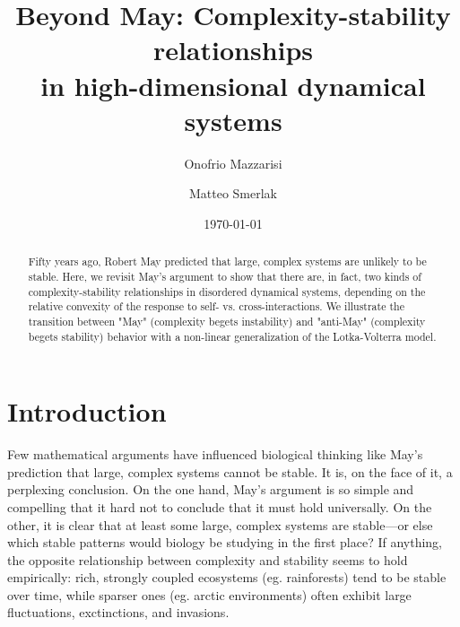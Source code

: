 \documentclass[%
 reprint,
 amsmath,amssymb,
 aps,
]{revtex4-2}
\begin{document}
\title{Beyond May: Complexity-stability relationships \\
in high-dimensional dynamical systems}

\author{Onofrio Mazzarisi}
\author{Matteo Smerlak}



\date{\today}%

\begin{abstract}
Fifty years ago, Robert May predicted that large, complex systems are unlikely to be stable. Here, we revisit May's argument to show that there are, in fact, two kinds of complexity-stability relationships in disordered dynamical systems, depending on the relative convexity of the response to self- vs. cross-interactions. We illustrate the transition between "May" (complexity begets instability) and "anti-May" (complexity begets stability) behavior with a non-linear generalization of the Lotka-Volterra model. 
\end{abstract}

\maketitle

\section{Introduction}

Few mathematical arguments have influenced biological thinking like May's prediction that large, complex systems cannot be stable. It is, on the face of it, a perplexing conclusion. On the one hand, May's argument is so simple and compelling that it hard not to conclude that it must hold universally. On the other, it is clear that at least some large, complex systems are stable---or else which stable patterns would biology be studying in the first place? If anything, the opposite relationship between complexity and stability seems to hold empirically: rich, strongly coupled ecosystems (eg. rainforests) tend to be  stable over time, while sparser ones (eg. arctic environments) often exhibit large fluctuations, exctinctions, and invasions. 
\end{document}
